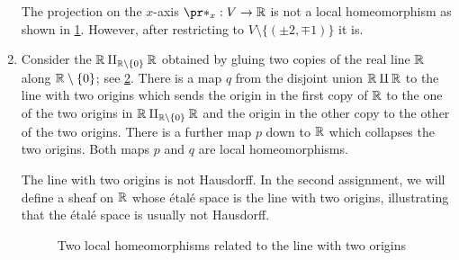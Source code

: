 \documentclass[../main.tex]{subfiles}
\begin{document}
\begin{exmp}
\begin{enumerate}
\begin{figure}
    \label{fig:zerolocuslocalhomeo}
\end{figure}
        The projection on the $x$-axis $\pr*_x\colon V \to \mathbb{R}$ is not a local homeomorphism as shown in \cref{fig:zerolocuslocalhomeo}.
        However, after restricting to $V\setminus \{(\pm 2, \mp 1)\}$ it is.
        \item
          Consider the  \(\bb R\pushout{\bb R\setminus\{0\}}\bb R\) obtained by gluing two copies of the real line \(\mathbb{R}\) along \(\mathbb{R}\setminus\{0\}\); see \cref{fig:local-homeomorphisms-line-two-origins}.
          There is a map \(q\) from the disjoint union \(\mathbb{R}\amalg\mathbb{R}\) to the line with two origins which sends the origin in the first copy of \(\mathbb{R}\) to the one of the two origins in \(\bb R\pushout{\bb R\setminus\{0\}}\bb R\) and the origin in the other copy to the other of the two origins.
          There is a further map \(p\) down to \(\mathbb{R}\) which collapses the two origins.
          Both maps \(p\) and \(q\) are local homeomorphisms.

          The line with two origins is not Hausdorff.
          In the second assignment, we will define a sheaf on \(\mathbb{R}\) whose étalé space is the line with two origins, illustrating that the étalé space is usually not Hausdorff.
          \begin{figure}
            \centering
            \caption{Two local homeomorphisms related to the line with two origins}
            \label{fig:local-homeomorphisms-line-two-origins}
          \end{figure}
    \end{enumerate}
\end{exmp}
\end{document}
